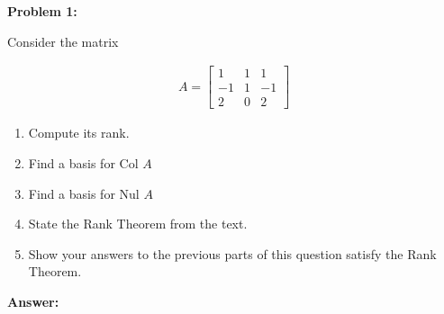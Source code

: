 \documentclass[10pt,letterpaper,final]{report}
\begin{document}
\begin{center}
  \vline
\end{center}

\medskip
\noindent\textbf{Problem 1:}
\medskip

Consider the matrix

\begin{align*}
  A = \begin{bmatrix}
        1  & 1 & 1  \\
        -1 & 1 & -1 \\
        2  & 0 & 2
      \end{bmatrix}
\end{align*}


\begin{enumerate}[label=(\alph*)]
  \item Compute its rank.
  \item Find a basis for $\text{Col } A$
  \item Find a basis for $\text{Nul } A$
  \item State the Rank Theorem from the text.
  \item Show your answers to the previous parts of this question satisfy the Rank Theorem.
\end{enumerate}

\medskip
\noindent\textbf{Answer:}
\end{document}
